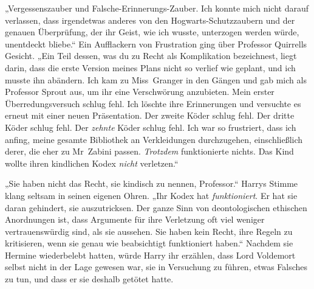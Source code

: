 „Vergessenszauber und Falsche-Erinnerungs-Zauber. Ich konnte mich nicht darauf verlassen, dass irgendetwas anderes von den Hogwarts-Schutzzaubern und der genauen Überprüfung, der ihr Geist, wie ich wusste, unterzogen werden würde, unentdeckt bliebe.“
Ein Aufflackern von Frustration ging über Professor Quirrells Gesicht.
„Ein Teil dessen, was du zu Recht als Komplikation bezeichnest, liegt darin, dass die erste Version meines Plans nicht so verlief wie geplant, und ich musste ihn abändern. Ich kam zu Miss~Granger in den Gängen und gab mich als Professor Sprout aus, um ihr eine Verschwörung anzubieten. Mein erster Überredungsversuch schlug fehl. Ich löschte ihre Erinnerungen und versuchte es erneut mit einer neuen Präsentation. Der zweite Köder schlug fehl. Der dritte Köder schlug fehl. Der \emph{zehnte} Köder schlug fehl. Ich war so frustriert, dass ich anfing, meine gesamte Bibliothek an Verkleidungen durchzugehen, einschließlich derer, die eher zu Mr~Zabini passen. \emph{Trotzdem} funktionierte nichts. Das Kind wollte ihren kindlichen Kodex \emph{nicht} verletzen.“

„Sie haben nicht das Recht, sie kindisch zu nennen, Professor.“
Harrys Stimme klang seltsam in seinen eigenen Ohren.
„Ihr Kodex hat \emph{funktioniert}. Er hat sie daran gehindert, sie auszutricksen. Der ganze Sinn von deontologischen ethischen Anordnungen ist, dass Argumente für ihre Verletzung oft viel weniger vertrauenswürdig sind, als sie aussehen. Sie haben kein Recht, ihre Regeln zu kritisieren, wenn sie genau wie beabsichtigt funktioniert haben.“
Nachdem sie Hermine wiederbelebt hatten, würde Harry ihr erzählen, dass Lord Voldemort selbst nicht in der Lage gewesen war, sie in Versuchung zu führen, etwas Falsches zu tun, und dass er sie deshalb getötet hatte.

